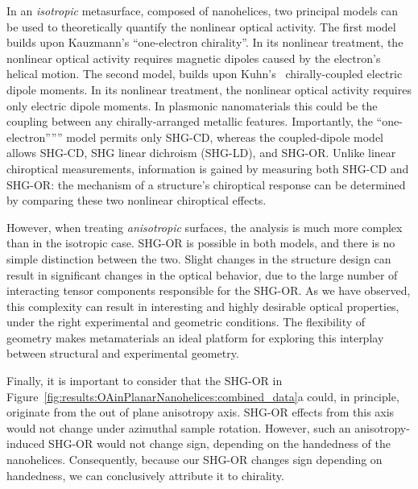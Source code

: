In an \textit{isotropic} metasurface, composed of nanohelices, two principal models can be used to theoretically quantify the nonlinear optical activity. The first model builds upon Kauzmann's ``one-electron chirality''.\cite{Kauzmann1957a}
In its nonlinear treatment, the nonlinear optical activity requires magnetic dipoles caused by the electron's helical motion.\cite{Hache2001a}
The second model, builds upon Kuhn's~\cite{Kuhn1930} chirally-coupled electric dipole moments. In its nonlinear treatment, the nonlinear optical activity requires only electric dipole moments.\cite{Hache2001a}
In plasmonic nanomaterials this could be the coupling between any chirally-arranged metallic features. Importantly, the ``one-electron''”'' model permits only SHG-CD, whereas the coupled-dipole model allows SHG-CD, SHG linear dichroism (SHG-LD), and SHG-OR.\cite{Fischer2005a}
Unlike linear chiroptical measurements, information is gained by measuring both SHG-CD and SHG-OR: the mechanism of a structure's chiroptical response can be determined by comparing these two nonlinear chiroptical effects. 

However, when treating \textit{anisotropic} surfaces, the analysis is much more complex than in the isotropic case. SHG-OR is possible in both models, and there is no simple distinction between the two. Slight changes in the structure design can result in significant changes in the optical behavior, due to the large number of interacting tensor components responsible for the SHG-OR. As we have observed, this complexity can result in interesting and highly desirable optical properties, under the right experimental and geometric conditions. The flexibility of geometry makes metamaterials an ideal platform for exploring this interplay between structural and experimental geometry. 

Finally, it is important to consider that the SHG-OR in Figure~\ref{fig:results:OAinPlanarNanohelices:combined_data}a could, in principle, originate from the out of plane anisotropy axis. SHG-OR effects from this axis would not change under azimuthal sample rotation. However, such an anisotropy-induced SHG-OR would not change sign, depending on the handedness of the nanohelices. Consequently, because our SHG-OR changes sign depending on handedness, we can conclusively attribute it to chirality. 

